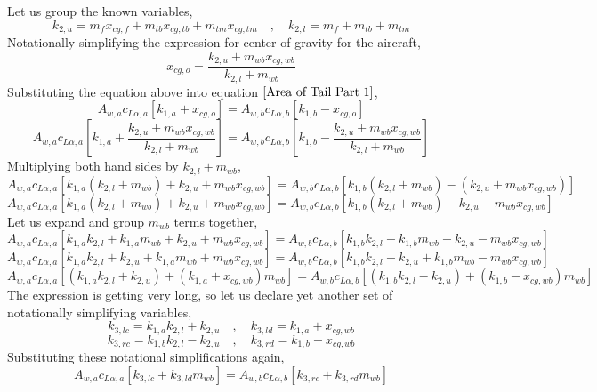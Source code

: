Let us group the known variables,
\begin{equation}k_{2,u} = m_{f}x_{cg,f} + m_{tb}x_{cg,tb} + m_{tm}x_{cg,tm} \quad,\quad k_{2,l} = m_{f} + m_{tb} + m_{tm} \label{k2 definitions}\end{equation}
Notationally simplifying the expression for center of gravity for the aircraft,
$$x_{cg,o} = \frac{ k_{2,u} + m_{wb}x_{cg,wb}}{k_{2,l} + m_{wb}}$$
Substituting the equation above into equation $\ref{Area of Tail Part 1}$,
$$A_{w,a} c_{L\alpha,a} \left[k_{1,a} + x_{cg,o}\right] = A_{w,b} c_{L\alpha,b}\left[k_{1,b} - x_{cg,o}\right] $$
$$A_{w,a} c_{L\alpha,a} \left[k_{1,a} + \frac{ k_{2,u} + m_{wb}x_{cg,wb}}{k_{2,l} + m_{wb}}\right] = A_{w,b} c_{L\alpha,b}\left[k_{1,b} - \frac{ k_{2,u} + m_{wb}x_{cg,wb}}{k_{2,l} + m_{wb}}\right] $$
Multiplying both hand sides by $k_{2,l} + m_{wb}$,
$$A_{w,a} c_{L\alpha,a} \left[k_{1,a}(k_{2,l} + m_{wb}) + k_{2,u} + m_{wb}x_{cg,wb} \right] = A_{w,b} c_{L\alpha,b}\left[k_{1,b}(k_{2,l} + m_{wb}) - (k_{2,u} + m_{wb}x_{cg,wb})\right] $$
$$A_{w,a} c_{L\alpha,a} \left[k_{1,a}(k_{2,l} + m_{wb}) + k_{2,u} + m_{wb}x_{cg,wb} \right] = A_{w,b} c_{L\alpha,b}\left[k_{1,b}(k_{2,l} + m_{wb}) - k_{2,u} - m_{wb}x_{cg,wb}\right]$$
Let us expand and group $m_{wb}$ terms together,
$$A_{w,a} c_{L\alpha,a} \left[k_{1,a}k_{2,l} + k_{1,a}m_{wb} + k_{2,u} + m_{wb}x_{cg,wb} \right] = A_{w,b} c_{L\alpha,b}\left[k_{1,b}k_{2,l} + k_{1,b}m_{wb} - k_{2,u} - m_{wb}x_{cg,wb}\right]$$
$$A_{w,a} c_{L\alpha,a} \left[k_{1,a}k_{2,l} + k_{2,u} + k_{1,a}m_{wb} + m_{wb}x_{cg,wb} \right] = A_{w,b} c_{L\alpha,b}\left[k_{1,b}k_{2,l} - k_{2,u} + k_{1,b}m_{wb} - m_{wb}x_{cg,wb}\right]$$
$$A_{w,a} c_{L\alpha,a} \left[(k_{1,a}k_{2,l} + k_{2,u}) + (k_{1,a} + x_{cg,wb})m_{wb}\right] = A_{w,b} c_{L\alpha,b}\left[(k_{1,b}k_{2,l} - k_{2,u}) + (k_{1,b} - x_{cg,wb})m_{wb} \right]$$
The expression is getting very long, so let us declare yet another set of notationally simplifying variables,
\begin{equation}k_{3,lc} = k_{1,a}k_{2,l} + k_{2,u} \quad,\quad k_{3,ld} = k_{1,a} + x_{cg,wb} \label{k3 definitions left}\end{equation}
\begin{equation}k_{3,rc} = k_{1,b}k_{2,l} - k_{2,u} \quad,\quad k_{3,rd} = k_{1,b} - x_{cg,wb} \label{k3 definitions right}\end{equation}
Substituting these notational simplifications again,
\begin{equation}A_{w,a} c_{L\alpha,a} \left[k_{3,lc} + k_{3,ld}m_{wb}\right] = A_{w,b} c_{L\alpha,b}\left[k_{3,rc} + k_{3,rd}m_{wb} \right] \label{General Tail Sizing}\end{equation}
